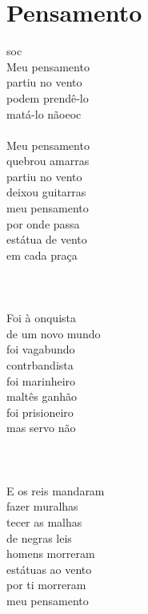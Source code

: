 \documentclass{article}
\begin{document}
\section{ Pensamento}
{soc}\\
Meu pensamento\\
partiu no vento\\
podem prendê-lo\\
matá-lo não{eoc}\\
\\
Meu pensamento\\
quebrou amarras\\
partiu no vento\\
deixou guitarras\\
meu pensamento\\
por onde passa\\
estátua de vento\\
em cada praça\\
\\
[Refrão]\\
\\
Foi à onquista\\
de um novo mundo\\
foi vagabundo\\
contrbandista\\
foi marinheiro\\
maltês ganhão\\
foi prisioneiro \\
mas servo não\\
\\
[Refrão]\\
\\
E os reis mandaram\\
fazer muralhas \\
tecer as malhas\\
de negras leis\\
homens morreram \\
estátuas ao vento\\
por ti morreram\\
meu pensamento\\
\end{document}
